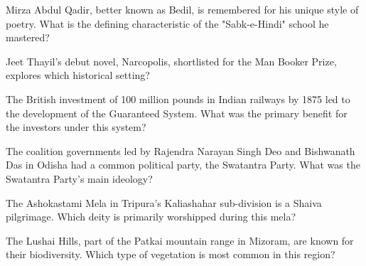 \documentclass[12pt,a4paper]{book}
\begin{document}
\begin{enhancedmcq}[Question 7]{Mirza Abdul Qadir, better known as Bedil, is remembered for his unique style of poetry. What is the defining characteristic of the "Sabk-e-Hindi" school he mastered?}
\end{enhancedmcq}

\begin{enhancedmcq}[Question 8]{Jeet Thayil's debut novel, Narcopolis, shortlisted for the Man Booker Prize, explores which historical setting?}
\end{enhancedmcq}

\begin{enhancedmcq}[Question 9]{The British investment of 100 million pounds in Indian railways by 1875 led to the development of the Guaranteed System. What was the primary benefit for the investors under this system?}
\end{enhancedmcq}

\begin{enhancedmcq}[Question 10]{The coalition governments led by Rajendra Narayan Singh Deo and Bishwanath Das in Odisha had a common political party, the Swatantra Party. What was the Swatantra Party's main ideology?}
\end{enhancedmcq}

\begin{enhancedmcq}[Question 11]{The Ashokastami Mela in Tripura's Kaliashahar sub-division is a Shaiva pilgrimage. Which deity is primarily worshipped during this mela?}
\end{enhancedmcq}

\begin{enhancedmcq}[Question 12]{The Lushai Hills, part of the Patkai mountain range in Mizoram, are known for their biodiversity. Which type of vegetation is most common in this region?}
\end{enhancedmcq}
\end{document}
